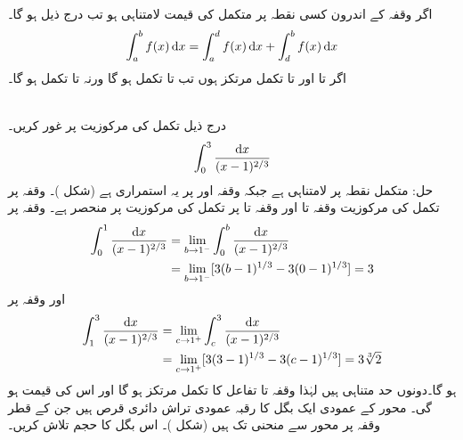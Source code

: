 اگر وقفہ  کے اندرون کسی نقطہ  پر متکمل  کی قیمت لامتناہی ہو تب درج ذیل ہو گا۔
\begin{align}
\int_a^bf(x)\dif x=\int_a^df(x)\dif x+\int_d^bf(x)\dif x
\end{align}
اگر  تا  اور  تا  تکمل مرتکز ہوں تب  تا  تکمل  ہو گا ورنہ  تا  تکمل  ہو گا۔

\\
درج ذیل تکمل کی مرکوزیت پر غور کریں۔
\begin{align*}
\int_0^3\frac{\dif x}{(x-1)^{2/3}}
\end{align*}
حل:\quad
متکمل  نقطہ  پر لامتناہی ہے جبکہ وقفہ \عددی{[0,1)} اور \عددی{(1,3]} پر یہ استمراری ہے (شکل )۔ وقفہ  پر تکمل کی مرکوزیت وقفہ  تا  اور وقفہ  تا  پر تکمل کی مرکوزیت پر منحصر ہے۔ وقفہ  پر 
\begin{align*}
\int_0^1\frac{\dif x}{(x-1)^{2/3}}&=\lim_{b\to 1^-}\int_0^b\frac{\dif x}{(x-1)^{2/3}}\\
&=\lim_{b\to 1^-}[3(b-1)^{1/3}-3(0-1)^{1/3}]=3
\end{align*}
اور وقفہ  پر
\begin{align*}
\int_1^3\frac{\dif x}{(x-1)^{2/3}}&=\lim_{c\to 1^+}\int_c^3\frac{\dif x}{(x-1)^{2/3}}\\
&=\lim_{c\to 1^+}[3(3-1)^{1/3}-3(c-1)^{1/3}]=3\sqrt[3]{2}
\end{align*}
ہو گا۔دونوں حد متناہی ہیں لہٰذا وقفہ  تا  تفاعل  کا تکمل مرتکز ہو گا اور اس کی قیمت  ہو گی۔
محور  کے عمودی ایک بگل کا رقبہ عمودی تراش دائری قرص ہیں جن کے قطر وقفہ  پر محور  سے  منحنی  تک ہیں (شکل )۔ اس بگل کا حجم تلاش کریں۔

